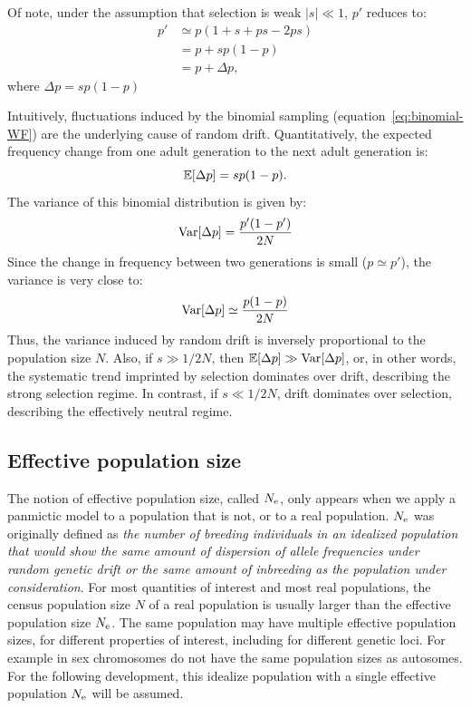 Of note, under the assumption that selection is weak $|s| \ll 1$, $p'$ reduces to:
\begin{align}
    p' & \simeq p (1 + s + ps - 2ps) \\
    & = p + sp(1-p) \\
    & = p + \Delta p,
\end{align}
where $\Delta p = sp(1-p)$

Intuitively, fluctuations induced by the binomial sampling (equation~\ref{eq:binomial-WF}) are the underlying cause of random drift.
Quantitatively, the expected frequency change from one adult generation to the next adult generation is:
\begin{equation}
    \operatorname{\mathbb{E}}[\Delta p] = s p (1-p).
\end{equation}
The variance of this binomial distribution is given by:
\begin{equation}
    \operatorname{\textrm{Var}}[\Delta p] = \frac{p' (1-p')}{2N}
\end{equation}
Since the change in frequency between two generations is small ($p \simeq p'$), the variance is very close to:
\begin{equation}
    \operatorname{\textrm{Var}}[\Delta p] \simeq \frac{p (1-p)}{2N}
\end{equation}
Thus, the variance induced by random drift is inversely proportional to the population size $N$.
Also, if $s \gg 1/2N$, then $\operatorname{\mathbb{E}}[\Delta p] \gg \operatorname{\textrm{Var}}[\Delta p]$, or, in other words, the systematic trend imprinted by selection dominates over drift, describing the strong selection regime.
In contrast, if $s \ll 1 / 2N$, drift dominates over selection, describing the effectively neutral regime.

\subsection{Effective population size}

The notion of effective population size, called $N_{\textrm{e}}$, only appears when we apply a panmictic model to a population that is not, or to a real population.
$N_{\textrm{e}}$ was originally defined as \textit{the number of breeding individuals in an idealized population that would show the same amount of dispersion of allele frequencies under random genetic drift or the same amount of inbreeding as the population under consideration}.
For most quantities of interest and most real populations, the census population size $N$ of a real population is usually larger than the effective population size $N_{\textrm{e}}$.
The same population may have multiple effective population sizes, for different properties of interest, including for different genetic loci.
For example in sex chromosomes do not have the same population sizes as autosomes.
For the following development, this idealize population with a single effective population $N_{\textrm{e}}$ will be assumed.

